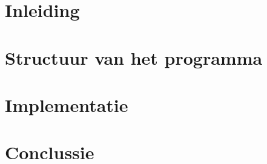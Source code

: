 \documentclass[11pt,a4paper]{article}
\begin{document}
\thispagestyle{empty}
	\begin{titlepage}
    
	\end{titlepage}

\thispagestyle{fancy}
	\section{Inleiding}
	

	\section{Structuur van het programma}
	

	\section{Implementatie}
	

	\section{Conclussie}
	
	
\end{document}
